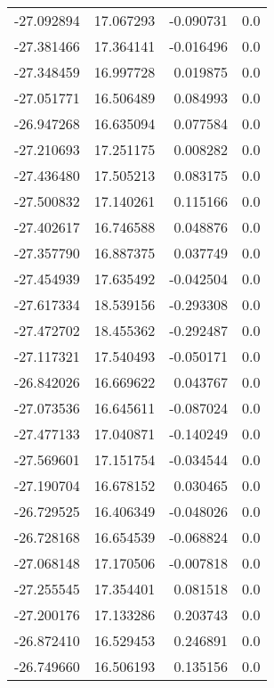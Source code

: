 \begin{tabular}{rrrr}
      -27.092894 &        17.067293 &   -0.090731 &   0.0 \\
      -27.381466 &        17.364141 &   -0.016496 &   0.0 \\
      -27.348459 &        16.997728 &    0.019875 &   0.0 \\
      -27.051771 &        16.506489 &    0.084993 &   0.0 \\
      -26.947268 &        16.635094 &    0.077584 &   0.0 \\
      -27.210693 &        17.251175 &    0.008282 &   0.0 \\
      -27.436480 &        17.505213 &    0.083175 &   0.0 \\
      -27.500832 &        17.140261 &    0.115166 &   0.0 \\
      -27.402617 &        16.746588 &    0.048876 &   0.0 \\
      -27.357790 &        16.887375 &    0.037749 &   0.0 \\
      -27.454939 &        17.635492 &   -0.042504 &   0.0 \\
      -27.617334 &        18.539156 &   -0.293308 &   0.0 \\
      -27.472702 &        18.455362 &   -0.292487 &   0.0 \\
      -27.117321 &        17.540493 &   -0.050171 &   0.0 \\
      -26.842026 &        16.669622 &    0.043767 &   0.0 \\
      -27.073536 &        16.645611 &   -0.087024 &   0.0 \\
      -27.477133 &        17.040871 &   -0.140249 &   0.0 \\
      -27.569601 &        17.151754 &   -0.034544 &   0.0 \\
      -27.190704 &        16.678152 &    0.030465 &   0.0 \\
      -26.729525 &        16.406349 &   -0.048026 &   0.0 \\
      -26.728168 &        16.654539 &   -0.068824 &   0.0 \\
      -27.068148 &        17.170506 &   -0.007818 &   0.0 \\
      -27.255545 &        17.354401 &    0.081518 &   0.0 \\
      -27.200176 &        17.133286 &    0.203743 &   0.0 \\
      -26.872410 &        16.529453 &    0.246891 &   0.0 \\
      -26.749660 &        16.506193 &    0.135156 &   0.0 \\

\end{tabular}
